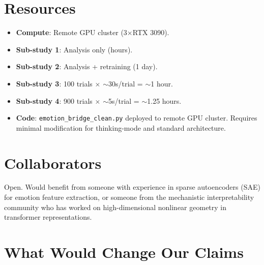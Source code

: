\documentclass[11pt,letterpaper]{article}
\begin{document}
\section{Resources}

\begin{itemize}
  \item \textbf{Compute}: Remote GPU cluster (3$\times$RTX 3090).
  \item \textbf{Sub-study 1}: Analysis only (hours).
  \item \textbf{Sub-study 2}: Analysis + retraining (1 day).
  \item \textbf{Sub-study 3}: 100 trials $\times$ $\sim$30s/trial =
    $\sim$1 hour.
  \item \textbf{Sub-study 4}: 900 trials $\times$ $\sim$5s/trial =
    $\sim$1.25 hours.
  \item \textbf{Code}: \texttt{emotion\_bridge\_clean.py} deployed to
    remote GPU cluster. Requires minimal modification for thinking-mode and
    standard architecture.
\end{itemize}

\section{Collaborators}

Open. Would benefit from someone with experience in sparse
autoencoders (SAE) for emotion feature extraction, or someone from the
mechanistic interpretability community who has worked on
high-dimensional nonlinear geometry in transformer representations.

\section{What Would Change Our Claims}
\end{document}
